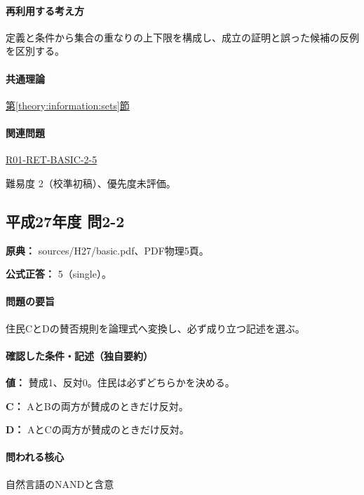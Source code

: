 \paragraph{再利用する考え方} 定義と条件から集合の重なりの上下限を構成し、成立の証明と誤った候補の反例を区別する。

\paragraph{共通理論} \hyperref[theory:information:sets]{第\ref*{theory:information:sets}節}

\paragraph{関連問題} \hyperref[q:r01-ret-basic-2-5]{R01-RET-BASIC-2-5}

\par 難易度 2（校準初稿）、優先度未評価。

\subsection{平成27年度 問2-2}
\label{q:h27-reg-basic-2-2}

\noindent\textbf{原典：} sources/H27/basic.pdf、PDF物理5頁。

\textbf{公式正答：} 5（single）。

\paragraph{問題の要旨} 住民CとDの賛否規則を論理式へ変換し、必ず成り立つ記述を選ぶ。

\paragraph{確認した条件・記述（独自要約）}\mbox{}\par

\noindent\textbf{値：} 賛成1、反対0。住民は必ずどちらかを決める。\par

\noindent\textbf{C：} AとBの両方が賛成のときだけ反対。\par

\noindent\textbf{D：} AとCの両方が賛成のときだけ反対。\par

\paragraph{問われる核心} 自然言語のNANDと含意

